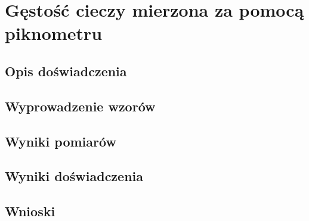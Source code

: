 \documentclass{article} %
\begin{document}
\section{Gęstość cieczy mierzona za pomocą piknometru}
\subsection{Opis doświadczenia}
\subsection{Wyprowadzenie wzorów}
\subsection{Wyniki pomiarów}
\subsection{Wyniki doświadczenia}
\subsection{Wnioski}
\end{document}
